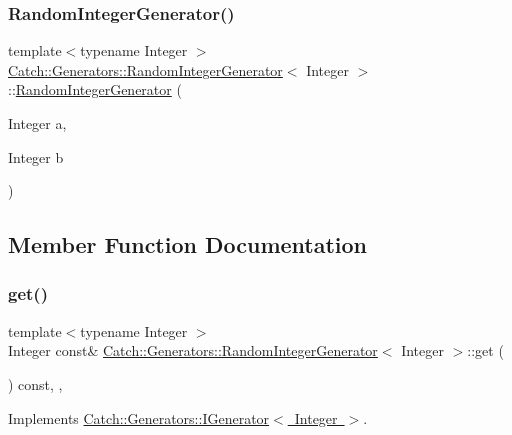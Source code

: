 \subsubsection{\texorpdfstring{Random\+Integer\+Generator()}{RandomIntegerGenerator()}}
{\footnotesize\ttfamily template$<$typename Integer $>$ \\
\mbox{\hyperlink{class_catch_1_1_generators_1_1_random_integer_generator}{Catch\+::\+Generators\+::\+Random\+Integer\+Generator}}$<$ Integer $>$\+::\mbox{\hyperlink{class_catch_1_1_generators_1_1_random_integer_generator}{Random\+Integer\+Generator}} (\begin{DoxyParamCaption}\item[{Integer}]{a,  }\item[{Integer}]{b }\end{DoxyParamCaption})\hspace{0.3cm}{\ttfamily [inline]}}



\subsection{Member Function Documentation}
\mbox{\label{class_catch_1_1_generators_1_1_random_integer_generator_aafbdf9028762f5e8f8ca9c317d686fca}} 
\subsubsection{\texorpdfstring{get()}{get()}}
{\footnotesize\ttfamily template$<$typename Integer $>$ \\
Integer const\& \mbox{\hyperlink{class_catch_1_1_generators_1_1_random_integer_generator}{Catch\+::\+Generators\+::\+Random\+Integer\+Generator}}$<$ Integer $>$\+::get (\begin{DoxyParamCaption}{ }\end{DoxyParamCaption}) const\hspace{0.3cm}{\ttfamily [inline]}, {\ttfamily [override]}, {\ttfamily [virtual]}}



Implements \mbox{\hyperlink{struct_catch_1_1_generators_1_1_i_generator_a525d381fc9249a885b075a0632a8579a}{Catch\+::\+Generators\+::\+I\+Generator$<$ Integer $>$}}.

